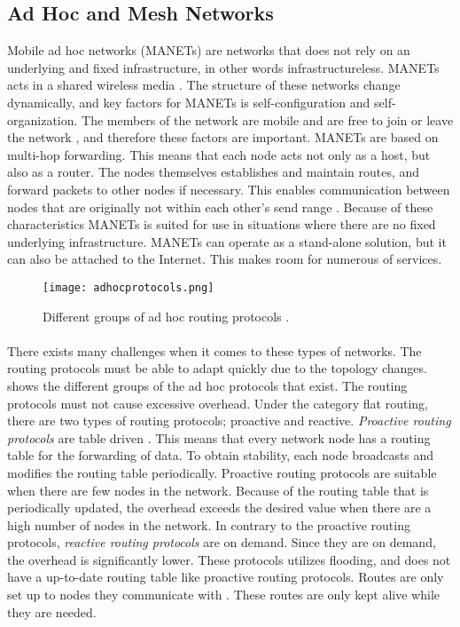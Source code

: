 \subsection{Ad Hoc and Mesh Networks}
Mobile ad hoc networks (MANETs) are networks that does not rely on an underlying and fixed infrastructure, in other words infrastructureless. MANETs acts in a shared wireless media \cite{adhoc}. The structure of these networks change dynamically, and key factors for MANETs is self-configuration and self-organization. The members of the network are mobile and are free to join or leave the network \cite{adhoc2}, and therefore these factors are important. MANETs are based on multi-hop forwarding. This means that each node acts not only as a host, but also as a router. The nodes themselves establishes and maintain routes, and forward packets to other nodes if necessary. This enables communication between nodes that are originally not within each other's send range \cite{adhoc2}. Because of these characteristics MANETs is suited for use in situations where there are no fixed underlying infrastructure. MANETs can operate as a stand-alone solution, but it can also be attached to the Internet. This makes room for numerous of services. 

\begin{figure}[h!]
  \centering
    \texttt{[image: adhocprotocols.png]}
     \caption{Different groups of ad hoc routing protocols \cite{adhoc}.}
\label{fig:adhoc}
\end{figure}

\paragraph{}
There exists many challenges when it comes to these types of networks. The routing protocols must be able to adapt quickly due to the topology changes.  shows the different groups of the ad hoc protocols that exist. The routing protocols must not cause excessive overhead. Under the category flat routing, there are two types of routing protocols; proactive and reactive. \textit{Proactive routing protocols} are table driven \citep{proactivereactive}. This means that every network node has a routing table for the forwarding of data. To obtain stability, each node broadcasts and modifies the routing table periodically. Proactive routing protocols are suitable when there are few nodes in the network. Because of the routing table that is periodically updated, the overhead exceeds the desired value when there are a high number of nodes in the network. In contrary to the proactive routing protocols, \textit{reactive routing protocols} are on demand. Since they are on demand, the overhead is significantly lower. These protocols utilizes flooding, and does not have a up-to-date routing table like proactive routing protocols. Routes are only set up to nodes they communicate with \cite{adhoc2}. These routes are only kept alive while they are needed. 




